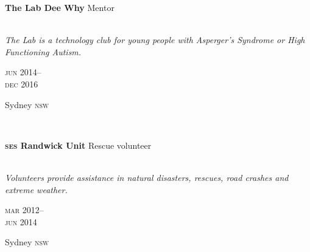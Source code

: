 \begin{minipage}[t]{\mainboxwidth\textwidth}
\textbf{The Lab Dee Why}\phantom{..} Mentor \\
\\
{\small
\textit{The Lab is a technology club for young people with Asperger’s Syndrome or High Functioning Autism.}
\par}
\end{minipage}
\begin{minipage}[t]{\detailboxwidth\textwidth}
{
\hfill \textsc{jun} 2014--\\ 
\hspace*{0pt} \hfill \textsc{dec} 2016
\par
{\small\hfill Sydney \textsc{nsw}}
}
\end{minipage}
\\

\begin{minipage}[t]{\mainboxwidth\textwidth}
\textbf{\textsc{ses} Randwick Unit}\phantom{..} Rescue volunteer\\
\\
{\small
\textit{Volunteers provide assistance in natural disasters, rescues, road crashes and extreme weather.}
\par}
\end{minipage}
\begin{minipage}[t]{\detailboxwidth\textwidth}
{
\hfill \textsc{mar} 2012--\\ 
\hspace*{0pt} \hfill \textsc{jun} 2014
\par
{\small\hfill Sydney \textsc{nsw}}
}
\end{minipage}


